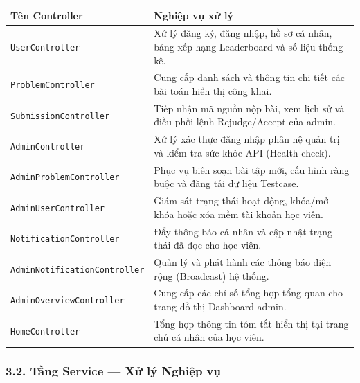 \documentclass[12pt,a4paper]{article}
\renewcommand{\_}{\BreakableUnderscore}
\begin{document}
\begin{longtable}[]{
  |>{\raggedright\arraybackslash}p{}
  |>{\raggedright\arraybackslash}p{}|}
\hline\rowcolor{tableHeader}
\begin{minipage}[b]{\linewidth}\raggedright
Tên Controller
\end{minipage} & \begin{minipage}[b]{\linewidth}\raggedright
Nghiệp vụ xử lý
\end{minipage} \\
\hline
\endhead
\hline
\endlastfoot
\texttt{UserController} & Xử lý đăng ký, đăng nhập, hồ sơ cá nhân, bảng xếp hạng Leaderboard và số liệu thống kê. \\
\hline
\texttt{ProblemController} & Cung cấp danh sách và thông tin chi tiết các bài toán hiển thị công khai. \\
\hline
\texttt{SubmissionController} & Tiếp nhận mã nguồn nộp bài, xem lịch sử và điều phối lệnh Rejudge/Accept của admin. \\
\hline
\texttt{AdminController} & Xử lý xác thực đăng nhập phân hệ quản trị và kiểm tra sức khỏe API (Health check). \\
\hline
\texttt{AdminProblemController} & Phục vụ biên soạn bài tập mới, cấu hình ràng buộc và đăng tải dữ liệu Testcase. \\
\hline
\texttt{AdminUserController} & Giám sát trạng thái hoạt động, khóa/mở khóa hoặc xóa mềm tài khoản học viên. \\
\hline
\texttt{NotificationController} & Đẩy thông báo cá nhân và cập nhật trạng thái đã đọc cho học viên. \\
\hline
\texttt{AdminNotificationController} & Quản lý và phát hành các thông báo diện rộng (Broadcast) hệ thống. \\
\hline
\texttt{AdminOverviewController} & Cung cấp các chỉ số tổng hợp tổng quan cho trang đồ thị Dashboard admin. \\
\hline
\texttt{HomeController} & Tổng hợp thông tin tóm tắt hiển thị tại trang chủ cá nhân của học viên. \\
\hline
\end{longtable}

\subsubsection{3.2. Tầng Service --- Xử lý Nghiệp vụ}
\end{document}

